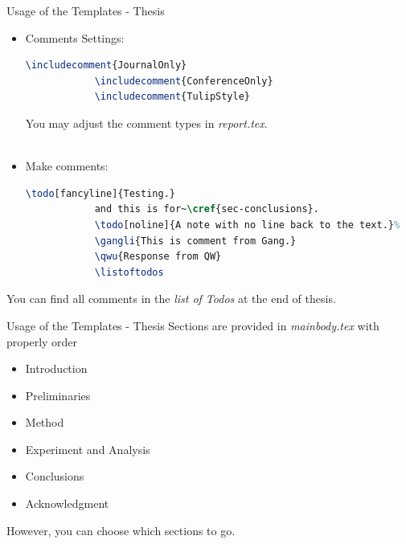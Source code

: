 \documentclass[
 size=12pt,
 paper=smartboard, %
 mode=present, %
 display=slides, %
style=tuliplab,
pauseslide,
fleqn,leqno]{powerdot}
\newcommand{\gangli}[1]{\draftnote{blue}{GLi:}{#1}}
\begin{document}


\begin{slide}[toc=,bm=,method=direct]{Usage of the Templates - Thesis}
	\begin{itemize}
		\item Comments Settings:
		\begin{lstlisting}[language=TeX]
			\includecomment{JournalOnly}  
			\includecomment{ConferenceOnly}  
			\includecomment{TulipStyle}
		\end{lstlisting}
		You may adjust the comment types in \textit{report.tex}. \\~\\
		\item Make comments:
		\begin{lstlisting}[language=TeX]
			\todo[fancyline]{Testing.}
			and this is for~\cref{sec-conclusions}.
			\todo[noline]{A note with no line back to the text.}%
			\gangli{This is comment from Gang.}
			\qwu{Response from QW}
			\listoftodos
		\end{lstlisting}
	\end{itemize}
	You can find all comments in the \textit{list of Todos} at the end of thesis.\\
\end{slide}


\begin{slide}[toc=,bm=]{Usage of the Templates - Thesis}
	Sections are provided in \textit{mainbody.tex} with properly order\\
	\begin{itemize}
		\item Introduction
		\item Preliminaries
		\item Method
		\item Experiment and Analysis
		\item Conclusions
		\item Acknowledgment
	\end{itemize}
	However, you can choose which sections to go. 
\end{slide}
\end{document}
